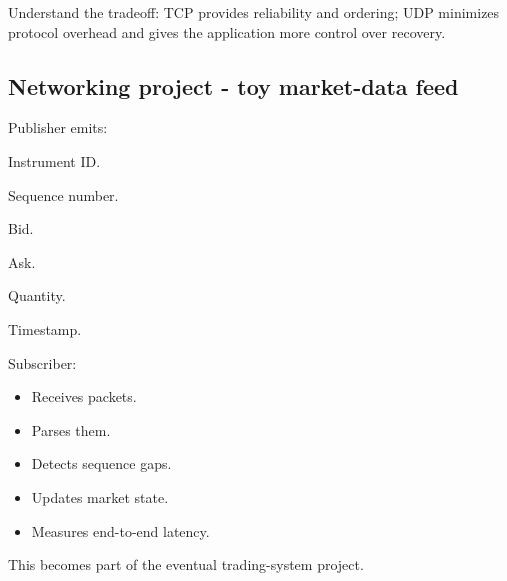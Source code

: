 \documentclass[11pt,letterpaper]{article}
\begin{document}
Understand the tradeoff: TCP provides reliability and ordering; UDP minimizes protocol overhead and gives the application more control over recovery.

\subsection*{Networking project - toy market-data feed}

Publisher emits:

\begin{topics}

\item Instrument ID.

\item Sequence number.

\item Bid.

\item Ask.

\item Quantity.

\item Timestamp.

\end{topics}

Subscriber:

\begin{itemize}

\item Receives packets.

\item Parses them.

\item Detects sequence gaps.

\item Updates market state.

\item Measures end-to-end latency.

\end{itemize}

This becomes part of the eventual trading-system project.
\end{document}
